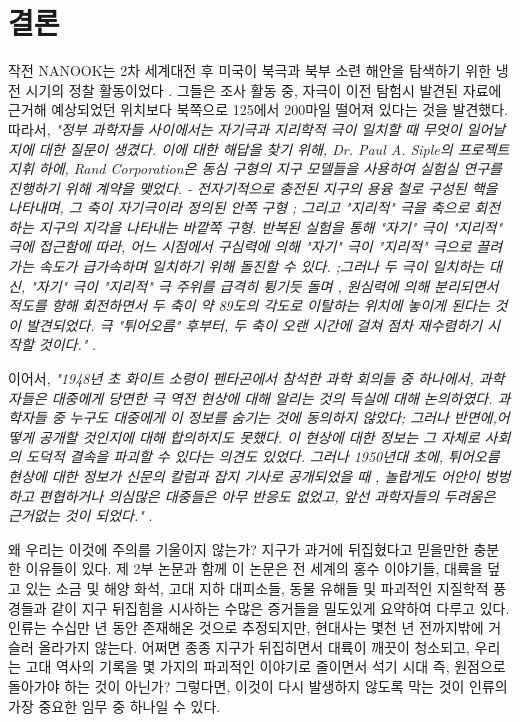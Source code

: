 \documentclass[10pt,twocolumn,letterpaper]{article}
\begin{document}
\section{결론}
작전 NANOOK는 2차 세계대전 후 미국이 북극과 북부 소련 해안을 탐색하기 위한 냉전 시기의 정찰 활동이었다 \cite{137}. 그들은 조사 활동 중, 자극이 이전 탐험시 발견된 자료에 근거해 예상되었던 위치보다 북쪽으로 125에서 200마일 떨어져 있다는 것을 발견했다. 따라서, \textit{"정부 과학자들 사이에서는 자기극과  지리학적 극이 일치할 때 무엇이 일어날지에 대한 질문이 생겼다. 이에 대한 해답을 찾기 위해, Dr. Paul A. Siple의 프로젝트 지휘 하에, Rand Corporation은 동심 구형의 지구 모델들을 사용하여  실험실 연구를 진행하기 위해 계약을 맺었다. - 전자기적으로 충전된 지구의 용융 철로 구성된 핵을 나타내며, 그 축이 자기극이라 정의된 안쪽 구형 ; 그리고 "지리적" 극을 축으로 회전하는 지구의 지각을 나타내는 바깥쪽 구형. 반복된 실험을 통해 "자기" 극이 "지리적" 극에 접근함에 따라, 어느 시점에서 구심력에 의해  "자기" 극이 "지리적" 극으로 끌려가는 속도가 급가속하며 일치하기 위해 돌진할 수 있다. ;그러나 두 극이 일치하는 대신, "자기" 극이 "지리적" 극 주위를 급격히 튕기듯 돌며 , 원심력에 의해 분리되면서 적도를 향해 회전하면서 두 축이 약 89도의 각도로 이탈하는 위치에 놓이게 된다는 것이 발견되었다. 극 "튀어오름" 후부터, 두 축이 오랜 시간에 걸쳐 점차 재수렴하기 시작할 것이다."} \cite{138,139}.

이어서, \textit{"1948년 초 화이트 소령이 펜타곤에서 참석한 과학 회의들 중 하나에서, 과학자들은 대중에게 당면한 극 역전  현상에 대해 알리는 것의 득실에 대해 논의하였다. 과학자들 중 누구도 대중에게 이 정보를 숨기는 것에 동의하지 않았다; 그러나 반면에,어떻게 공개할 것인지에 대해 합의하지도 못했다. 이 현상에 대한 정보는 그 자체로 사회의 도덕적 결속을 파괴할 수 있다는 의견도 있었다. 그러나 1950년대 초에, 튀어오름 현상에 대한 정보가 신문의 칼럼과 잡지 기사로 공개되었을 때 , 놀랍게도 어안이 벙벙하고 편협하거나 의심많은 대중들은 아무 반응도 없었고, 앞선 과학자들의 두려움은 근거없는 것이 되었다."} \cite{138,139}.

왜 우리는 이것에 주의를 기울이지 않는가? 지구가 과거에 뒤집혔다고 믿을만한  충분한 이유들이 있다. 제 2부 논문과 함께 이 논문은 전 세계의 홍수 이야기들, 대륙을 덮고 있는 소금 및 해양 화석, 고대 지하 대피소들, 동물 유해들 및 파괴적인 지질학적 풍경들과 같이 지구 뒤집힘을 시사하는 수많은 증거들을 밀도있게 요약하여 다루고 있다. 인류는 수십만 년 동안 존재해온 것으로 추정되지만, 현대사는 몇천 년 전까지밖에 거슬러 올라가지 않는다. 어쩌면 종종 지구가 뒤집히면서 대륙이 깨끗이 청소되고, 우리는 고대 역사의 기록을 몇 가지의 파괴적인 이야기로 줄이면서 석기 시대 즉, 원점으로 돌아가야 하는 것이 아닌가? 그렇다면, 이것이 다시 발생하지 않도록 막는 것이 인류의 가장 중요한 임무 중 하나일 수 있다.
\end{document}
